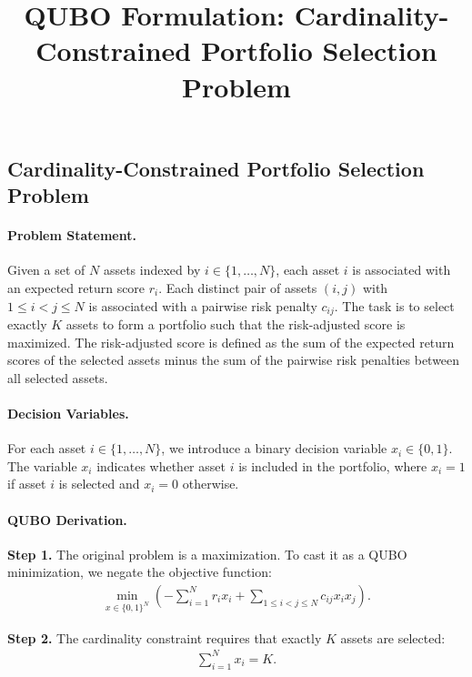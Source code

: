 \documentclass[12pt]{article}
\title{QUBO Formulation: Cardinality-Constrained Portfolio Selection Problem}
\date{}
\begin{document}
\maketitle

\subsection*{Cardinality-Constrained Portfolio Selection Problem}

\paragraph{Problem Statement.}
Given a set of $N$ assets indexed by $i \in \{1,\dots,N\}$, each asset $i$ is associated with an expected return score $r_i$. Each distinct pair of assets $(i,j)$ with $1 \le i < j \le N$ is associated with a pairwise risk penalty $c_{ij}$. The task is to select exactly $K$ assets to form a portfolio such that the risk-adjusted score is maximized. The risk-adjusted score is defined as the sum of the expected return scores of the selected assets minus the sum of the pairwise risk penalties between all selected assets.

\paragraph{Decision Variables.}
For each asset $i \in \{1,\dots,N\}$, we introduce a binary decision variable $x_i \in \{0,1\}$. The variable $x_i$ indicates whether asset $i$ is included in the portfolio, where $x_i = 1$ if asset $i$ is selected and $x_i = 0$ otherwise.

\paragraph{QUBO Derivation.}
\textbf{Step 1.} The original problem is a maximization. To cast it as a QUBO minimization, we negate the objective function:
\begin{align}
    \min_{x \in \{0,1\}^N} \left( -\sum_{i=1}^N r_i x_i + \sum_{1 \le i < j \le N} c_{ij} x_i x_j \right).
\end{align}

\textbf{Step 2.} The cardinality constraint requires that exactly $K$ assets are selected:
\begin{align}
    \sum_{i=1}^N x_i = K.
\end{align}
\end{document}
